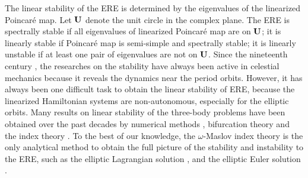 \documentclass[11pt]{article}
\def\lb{\label}
\def\R{{\bf R}}
\def\U{{\bf U}}
\def\om{{\omega}}
\begin{document}


The linear stability of the ERE is determined by the eigenvalues of the linearized Poincar\'e map. 
Let $\U$ denote the unit circle in the complex plane. The ERE is spectrally stable if all eigenvalues of linearized Poincar\'e map  are on $\U$; it is linearly stable if Poincar\'e map is semi-simple and spectrally stable; it is linearly unstable if at least one pair of eigenvalues are not on $\U$.
Since the nineteenth century \cite{R2}, the researches on the stability have always been active in celestial mechanics because it reveals the dynamics near the period orbits. 
However, it has always been one difficult task to obtain the linear stability of ERE, because the linearized Hamiltonian systems are non-autonomous, especially for the elliptic orbits.
Many results on linear stability of the three-body problems have been obtained over the past decades by numerical methods \cite{MSS,MSS1,MSS2}, bifurcation theory \cite{R1} and the index theory \cite{HS,HLS,HuOuWang2015ARMA,Zhou2017}.  
To the best of our knowledge, the $\om$-Maslov index theory is the only analytical method to obtain the full picture of the stability and instability to the ERE, such as the elliptic Lagrangian solution \cite{HS,HLS,HuOuWang2015ARMA}, and the elliptic Euler solution \cite{Zhou2017,ZhonLong2017CMDA}.
\end{document}
